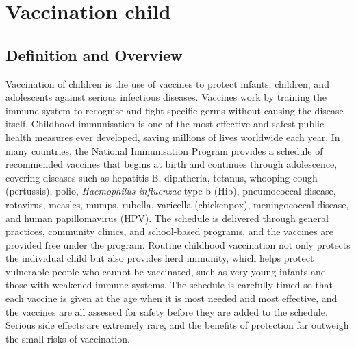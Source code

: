 \chapter{Vaccination child}

\section*{Definition and Overview}
Vaccination of children is the use of vaccines to protect infants, children, and adolescents against serious infectious diseases. Vaccines work by training the immune system to recognise and fight specific germs without causing the disease itself. Childhood immunisation is one of the most effective and safest public health measures ever developed, saving millions of lives worldwide each year. In many countries, the National Immunisation Program provides a schedule of recommended vaccines that begins at birth and continues through adolescence, covering diseases such as hepatitis B, diphtheria, tetanus, whooping cough (pertussis), polio, \textit{Haemophilus influenzae} type b (Hib), pneumococcal disease, rotavirus, measles, mumps, rubella, varicella (chickenpox), meningococcal disease, and human papillomavirus (HPV). The schedule is delivered through general practices, community clinics, and school-based programs, and the vaccines are provided free under the program. Routine childhood vaccination not only protects the individual child but also provides herd immunity, which helps protect vulnerable people who cannot be vaccinated, such as very young infants and those with weakened immune systems. The schedule is carefully timed so that each vaccine is given at the age when it is most needed and most effective, and the vaccines are all assessed for safety before they are added to the schedule. Serious side effects are extremely rare, and the benefits of protection far outweigh the small risks of vaccination.

